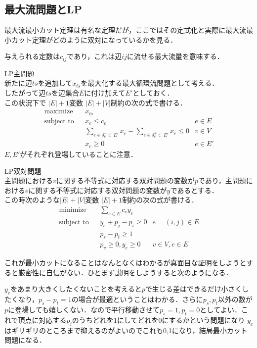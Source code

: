 \documentclass[13pt, a4paper, landscape]{jarticle}
\theoremstyle{nonitalic} %
\begin{document}
\subsection{最大流問題とLP}
最大流最小カット定理は有名な定理だが，ここではその定式化と実際に最大流最小カット定理がどのように双対になっているかを見る．

与えられる定数は$c_{ij}$であり，これは辺$ij$に流せる最大流量を意味する．

LP主問題 \\
新たに辺$ts$を追加して$x_{ts}$を最大化する最大循環流問題として考える． \\
したがって辺$ts$を辺集合$E$に付け加えて$E'$としておく．\\
この状況下で $|E|+1$変数 $|E|+|V|$制約の次の式で書ける．
\begin{align}
 &&&&&\textrm{maximize}   && x_{ts}  \\
 &&&&&\textrm{subject to} && x_e\leq c_e & e \in E  &&&&&\\
 &&&&&                    && \sum_{e \in \delta_v^- \subset E'} x_e - \sum_{e \in \delta_v^+  \subset E'} x_e \leq 0 & v \in V &&&&& \\
 &&&&&                    && x_e \geq 0 & e \in E' &&&&&
\end{align}
$E, E'$がそれぞれ登場していることに注意．


LP双対問題 \\
主問題における$v$に関する不等式に対応する双対問題の変数が$p$であり，主問題における$e$に関する不等式に対応する双対問題の変数が$y$であるとする．\\
この時次のような$|E|+|V|$変数 $|E|+1$制約の次の式が書ける．
\begin{align}
 &&&&&\textrm{minimize}   && \sum_{e \in E} c_e y_e  \\
 &&&&&\textrm{subject to} && y_e + p_j - p_i \geq 0 &  e = (i, j) \in E  &&&&&\\
 &&&&&                    && p_s - p_t  \geq 1         &&&&& \\
 &&&&&                    && p_v \geq 0,  y_e \geq 0 &  v \in V, e \in E &&&&&
\end{align}

これが最小カットになることはなんとなくはわかるが真面目な証明をしようとすると厳密性に自信がない．ひとまず説明をしようすると次のようになる．

$y_e$をあまり大きくしたくないことを考えると$p$で生じる差はできるだけ小さくしたくなり，$p_s-p_t=1$の場合が最適ということはわかる．さらに$p_s, p_t$以外の数が$p$に登場しても嬉しくない．なので平行移動させて$p_s=1, p_t=0$としてよい．これで頂点に対応する$p_i$のうちどれを1にしてどれを0にするかという問題になり $y_e$ はギリギリのところまで抑えるのがよいのでこれも0,1になり，結局最小カット問題になる．
\end{document}
